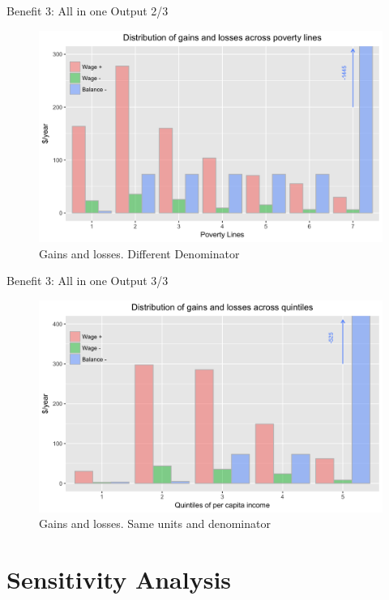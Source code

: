 \documentclass{beamer}
\begin{document}
\begin{frame}{Benefit 3: All in one Output 2/3}
\begin{figure}[h!]
\centering
\hspace*{-3em}
\includegraphics[scale = 0.13]{../Images/alt_pe2}
\caption{Gains and losses. Different Denominator}
\end{figure}	
\end{frame}

\begin{frame}{Benefit 3: All in one Output 3/3}
\begin{figure}[h!]
\centering
\hspace*{-3em}
\includegraphics[scale = 0.13]{../Images/policy_est}
\caption{Gains and losses. Same units and denominator}
\end{figure}	
\end{frame}


\section{Sensitivity Analysis}
\end{document}
